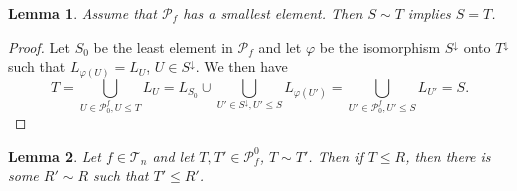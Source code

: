 \documentclass[12pt]{article}
\newtheorem{lemma}{Lemma}
\theoremstyle{definition}
\theoremstyle{remark}
\def\Te{\mathcal T}
\def\Pe{\mathcal P}
\begin{document}
\begin{lemma}\label{lemma:sim_least} Assume that $\Pe_f$ has a smallest element. Then
$S\sim T$ implies $S=T$.

\end{lemma}

\begin{proof} Let $S_0$ be the least element in $\Pe_f$ and let $\varphi$ be the isomorphism $S^\downarrow$ onto $T^\downarrow$ such
that $L_{\varphi(U)}=L_U$, $U\in S^\downarrow$. We then have
\[
T=\bigcup_{U\in\Pe_0^f, U\le T} L_U=L_{S_0}\cup \bigcup_{U'\in S^\downarrow, U'\le S} L_{\varphi(U')}=
\bigcup_{U'\in \Pe_0^f, U'\le S}L_{U'}=S.
\]

\end{proof}






\begin{lemma}\label{lemma:equiv}  Let $f\in \Te_n$ and let $T,T'\in \Pe_f^0$,  $T\sim T'$. Then if $T\le
R$, then there is some $R'\sim R$ such that $T'\le R'$. 

\end{lemma}
\end{document}
